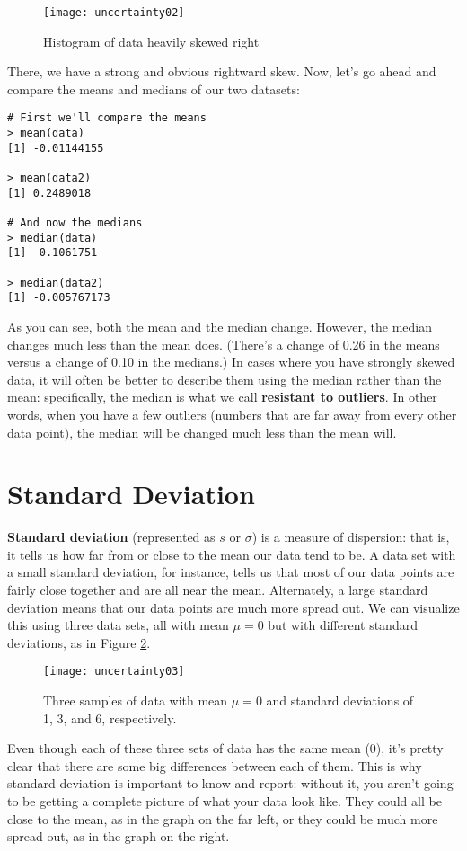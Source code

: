 \begin{figure}[h!]
\texttt{[image: uncertainty02]}
\caption{Histogram of data heavily skewed right}
\label{fig:uncertainty02}
\end{figure}
\clearpage
There, we have a strong and obvious rightward skew. Now, let's go ahead and compare the means and medians of our two datasets:

\begin{Verbatim}[samepage=TRUE]
# First we'll compare the means
> mean(data)
[1] -0.01144155
 
> mean(data2)
[1] 0.2489018
 
# And now the medians
> median(data)
[1] -0.1061751
 
> median(data2)
[1] -0.005767173
\end{Verbatim}

As you can see, both the mean and the median change. However, the median changes much less than the mean does. (There's a change of 0.26 in the means versus a change of 0.10 in the medians.) In cases where you have strongly skewed data, it will often be better to describe them using the median rather than the mean: specifically, the median is what we call \textbf{resistant to outliers}. In other words, when you have a few outliers (numbers that are far away from every other data point), the median will be changed much less than the mean will.

\section{Standard Deviation}
\textbf{Standard deviation} (represented as $s$ or $\sigma$) is a measure of dispersion: that is, it tells us how far from or close to the mean our data tend to be. A data set with a small standard deviation, for instance, tells us that most of our data points are fairly close together and are all near the mean. Alternately, a large standard deviation means that our data points are much more spread out. We can visualize this using three data sets, all with mean $\mu=0$ but with different standard deviations, as in Figure \ref{fig:uncertainty03}.

\begin{figure}[h!]
\texttt{[image: uncertainty03]}
\caption{Three samples of data with mean \(\mu=0\) and standard deviations of 1, 3, and 6, respectively.}
\label{fig:uncertainty03}
\end{figure}

Even though each of these three sets of data has the same mean (0), it's pretty clear that there are some big differences between each of them. This is why standard deviation is important to know and report: without it, you aren't going to be getting a complete picture of what your data look like. They could all be close to the mean, as in the graph on the far left, or they could be much more spread out, as in the graph on the right.

